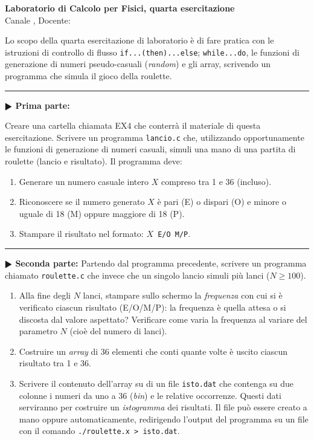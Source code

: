 \documentclass[11pt]{article}
\begin{document}
\pagestyle{empty}

\begin{center}
{\Large \bf  Laboratorio di Calcolo per Fisici, quarta esercitazione\\[2mm]}
{\large Canale \canale, Docente: \docente}
\end{center}
\vspace{4mm}

\begin{mdframed}[backgroundcolor=panna]
  Lo scopo della quarta esercitazione di laboratorio \`e di fare pratica con
  le istruzioni di controllo di flusso \texttt{if...(then)...else}; \texttt{while...do}, le funzioni di generazione di numeri pseudo-casuali (\textit{random}) e gli array, scrivendo un programma che simula il gioco della roulette.
  \end{mdframed}
%
%



\hrule
\vspace{2mm}
\textbf{$\RHD$ Prima parte:}

Creare una cartella  chiamata EX4 che conterr\`{a} il materiale di questa esercitazione.
Scrivere un programma \texttt{lancio.c} che, utilizzando opportunamente le
funzioni di generazione di numeri casuali, simuli una mano di una partita di
roulette (lancio e risultato). Il programma deve:
\begin{enumerate}
\item Generare un numero casuale intero $X$ compreso tra 1 e 36 (incluso).
\item Riconoscere se il numero generato $X$ \`e pari (E) o dispari (O) e minore
o uguale di 18 (M) oppure maggiore di 18 (P).
\item Stampare il risultato nel formato: \texttt{$X$ E/O M/P}.
\end{enumerate}

\hrule
\vspace{2mm}
\textbf{$\RHD$ Seconda parte:}
Partendo dal programma precedente, scrivere un programma chiamato \texttt{roulette.c} che
invece che un singolo lancio simuli pi\`u lanci ($N \ge 100$).
\begin{enumerate}
\item Alla fine degli $N$ lanci, stampare sullo schermo la {\em frequenza\/}
con cui si \`e verificato ciascun risultato (E/O/M/P): la frequenza
\`e quella attesa o si discosta dal valore aspettato? Verificare come
varia la frequenza al variare del parametro $N$ (cioè del numero di lanci).
\item Costruire un {\em array\/} di 36 elementi che conti quante volte è uscito ciascun risultato tra 1 e 36.
\item Scrivere il contenuto dell'array su di un file
  \texttt{isto.dat} che contenga
su due colonne i numeri da uno a 36 ({\em bin\/}) e le relative occorrenze.
Questi dati serviranno per costruire un {\em istogramma\/} dei risultati.
Il file pu\`o essere creato a mano oppure automaticamente, redirigendo l'output del programma
su un file con il comando \texttt{./roulette.x > isto.dat}.
\end{enumerate}
\end{document}
